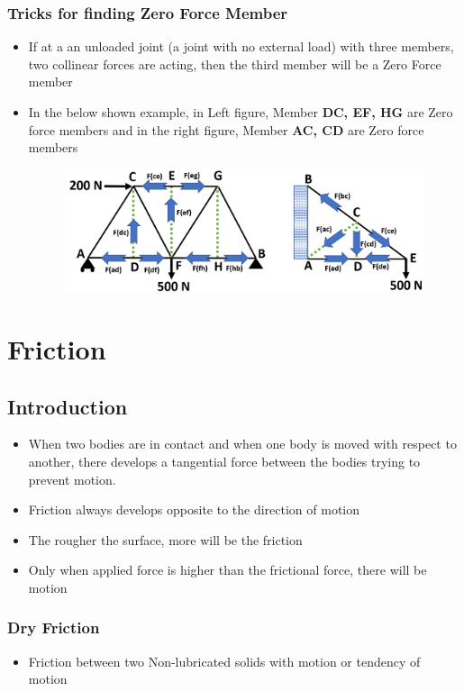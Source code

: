 \documentclass[8pt]{report}
\begin{document}
\subsection{Tricks for finding Zero Force Member}
	\begin{itemize}
		\item If at a an unloaded joint (a joint with no external load) with three members, two collinear forces are acting, then the third member will be a Zero Force member	
		\item In the below shown example, in Left figure, Member \textbf{DC, EF, HG} are Zero force members and in the right figure, Member \textbf{AC, CD} are Zero force members	
		\begin{figure}[H]
			\centering
			\includegraphics[scale=0.5]{zeroforcemember.png}
		\end{figure}
	\end{itemize}\hrulefill
\chapter{Friction}
\section{Introduction}
	\begin{itemize}
		\item When two bodies are in contact and when one body is moved with respect to another, there develops a tangential force between the bodies trying to prevent motion. 
		\item Friction always develops opposite to the direction of motion
		\item The rougher the surface, more will be the friction
		\item Only when applied force is higher than the frictional force, there will be motion
	\end{itemize}
\subsection{Dry Friction}
	\begin{itemize}
		\item Friction between two Non-lubricated solids with motion or tendency of motion
	\end{itemize}
\end{document}

